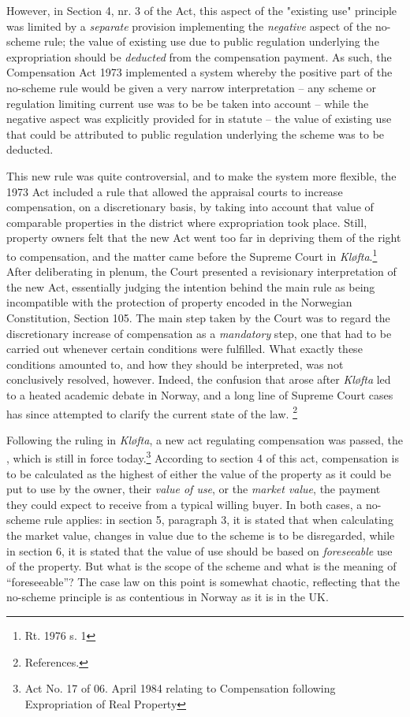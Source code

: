 However, in Section 4, nr. 3 of the Act, this aspect of the "existing use" principle was limited by a \emph{separate} provision implementing the \emph{negative} aspect of the no-scheme rule; the value of existing use due to public regulation underlying the expropriation should be \emph{deducted} from the compensation payment. As such, the Compensation Act 1973 implemented a system whereby the positive part of the no-scheme rule would be given a very narrow interpretation -- any scheme or regulation limiting current use was to be be taken into account -- while the negative aspect was explicitly provided for in statute -- the value of existing use that could be attributed to public regulation underlying the scheme was to be deducted.

This new rule was quite controversial, and to make the system more flexible, the 1973 Act included a rule that allowed the appraisal courts to increase compensation, on a discretionary basis, by taking into account that value of comparable properties in the district where expropriation took place. Still, property owners felt that the new Act went too far in depriving them of the right to compensation, and the matter came before the Supreme Court in \emph{Kløfta}.\footnote{Rt. 1976 s. 1} After deliberating in plenum, the Court presented a revisionary interpretation of the new Act, essentially judging the intention behind the main rule as being incompatible with the protection of property encoded in the Norwegian Constitution, Section 105. The main step taken by the Court was to regard the discretionary increase of compensation as a \emph{mandatory} step, one that had to be carried out whenever certain conditions were fulfilled. What exactly these conditions amounted to, and how they should be interpreted, was not conclusively resolved, however. Indeed, the confusion that arose after \emph{Kløfta} led to a heated academic debate in Norway, and a long line of Supreme Court cases has since attempted to clarify the current state of the law. \footnote{References.}

Following the ruling in \emph{Kløfta}, a new act regulating compensation was passed, the \cite{ca84}, which is still in force today.\footnote{Act No. 17 of 06. April 1984 relating to Compensation following Expropriation of Real Property} According to section 4 of this act, compensation is to be calculated as the highest of either the value of the property as it could be put to use by the owner, their \emph{value of use}, or the \emph{market value}, the payment they could expect to receive from a typical willing buyer. In both cases, a no-scheme rule applies: in section 5, paragraph 3, it is stated that when calculating the market value, changes in value due to the scheme is to be disregarded, while in section 6, it is stated that the value of use should be based on \emph{foreseeable} use of the property. But what is the scope of the scheme and what is the meaning of ``foreseeable''? The case law on this point is somewhat chaotic, reflecting that the no-scheme principle is as contentious in Norway as it is in the UK.

